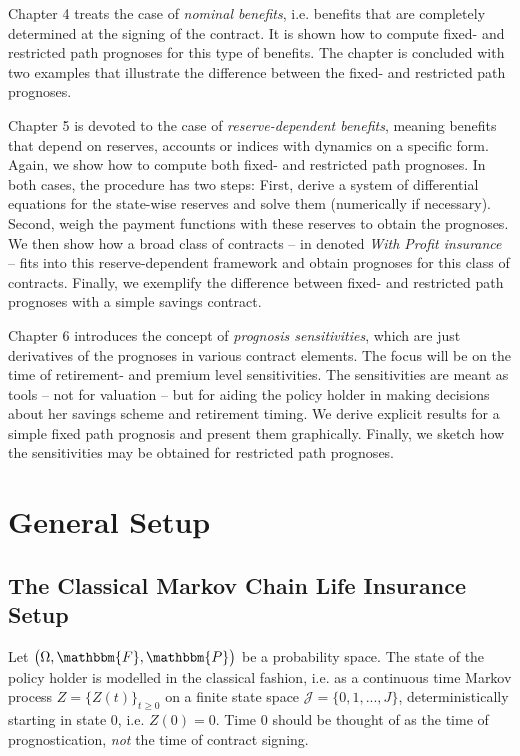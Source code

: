 \documentclass{article}
\newcommand{\1}[1]{\mathbbm{1}_{\left\lbrace #1 \right\rbrace}}
\theoremstyle{break}
\theoremstyle{remark}
\numberwithin{equation}{section}
\begin{document}
Chapter 4 treats the case of \textit{nominal benefits}, i.e. benefits that are completely determined at the signing of the contract. It is shown how to compute fixed- and restricted path prognoses for this type of benefits. The chapter is concluded with two examples that illustrate the difference between the fixed- and restricted path prognoses.

Chapter 5 is devoted to the case of \textit{reserve-dependent benefits}, meaning benefits that depend on reserves, accounts or indices with dynamics on a specific form. Again, we show how to compute both fixed- and restricted path prognoses. In both cases, the procedure has two steps: First, derive a system of differential equations for the state-wise reserves and solve them (numerically if necessary). Second, weigh the payment functions with these reserves to obtain the prognoses. We then show how a broad class of contracts -- in \cite{Liv2Bog} denoted \textit{With Profit insurance} -- fits into this reserve-dependent framework and obtain prognoses for this class of contracts. Finally, we exemplify the difference between fixed- and restricted path prognoses with a simple savings contract.

Chapter 6 introduces the concept of \textit{prognosis sensitivities}, which are just derivatives of the prognoses in various contract elements. The focus will be on the time of retirement- and premium level sensitivities. The sensitivities are meant as tools -- not for valuation -- but for aiding the policy holder in making decisions about her savings scheme and retirement timing. We derive explicit results for a simple fixed path prognosis and present them graphically. Finally, we sketch how the sensitivities may be obtained for restricted path prognoses.

\newpage

\section{General Setup}

\subsection{The Classical Markov Chain Life Insurance Setup}

Let $\left( \Omega, \mathbbm{F}, \mathbbm{P} \right)$ be a probability space. The state of the policy holder is modelled in the classical fashion, i.e. as a continuous time Markov process $Z = \{ Z(t) \}_{t \geq 0}$ on a finite state space $\mathcal{J}= \{ 0, 1, ..., J \} $, deterministically starting in state $0$, i.e. $Z(0) = 0$. Time 0 should be thought of as the time of prognostication, \textit{not} the time of contract signing.
\end{document}
